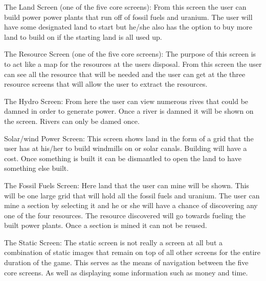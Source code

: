 \documentclass[msc,oneside]{ubcthesis}%
\begin{document}
\noindent The Land Screen (one of the five core screens): \newline
\indent From this screen the user can build power power plants that run off of fossil fuels and uranium. The user will have some designated land to start but he/she also has the option to buy more land to build 
on if the starting land is all used up.
\bigskip

\noindent The Resource Screen (one of the five core screens): \newline
\indent The purpose of this screen is to act like a map for the resources at the users disposal. From this 
screen the user can see all the resource that will be needed and the user can get at the three resource 
screens that will allow the user to extract the resources.
\bigskip

\noindent The Hydro Screen: \newline
\indent From here the user can view numerous rives that could be damned in order to generate power. Once a 
river is damned it will be shown on the screen. Rivers can only be damed once. 
\bigskip

\noindent Solar/wind Power Screen: \newline
\indent This screen shows land in the form of a grid that the user has at his/her to build windmills on or 
solar canals. Building will have a cost. Once something is built it can be dismantled to open the land 
to have something else built. 
\bigskip


\noindent The Fossil Fuels Screen: \newline
\indent Here land that the user can mine will be shown. This will be one large grid that will hold all the 
fossil fuels and uranium. The user can mine a section by selecting it and he or she will have a chance 
of discovering any one of the four resources. The resource discovered will go towards fueling the built 
power plants. Once a section is mined it can not be reused. 
\bigskip

\noindent The Static Screen: \newline
\indent The static screen is not really a screen at all but a combination of static images that remain on 
top of all other screens for the entire duration of the game. This serves as the means of navigation 	
between the five core screens. As well as displaying some information such as money and time. 
\bigskip

\end{document}
